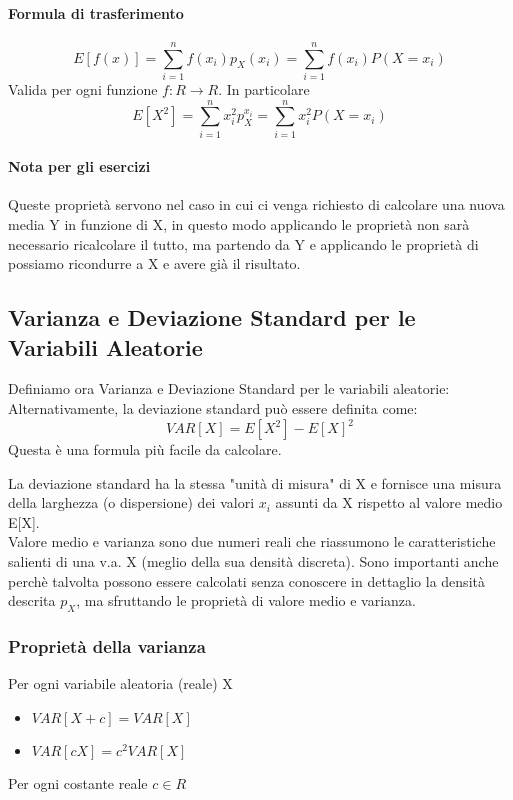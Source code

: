 \paragraph{Formula di trasferimento}
\begin{equation}
	E[f(x)] = \sum_{i = 1}^{n} f(x_i)p_X(x_i)
	= \sum_{i = 1}^{n}f(x_i)P(X = x_i)
\end{equation}
Valida per ogni funzione $f:R \to R$. In particolare
\begin{equation}
	E[X^2] = \sum_{i = 1}^{n} x_i^2 p_X^{x_i} = \sum_{i = 1}^{n} x_i^2P(X=x_i)
\end{equation}

\paragraph*{Nota per gli esercizi} Queste proprietà servono nel caso in cui ci venga
richiesto di calcolare una nuova media Y in funzione di X, in questo modo applicando
le proprietà non sarà necessario ricalcolare il tutto, ma partendo da Y e applicando
le proprietà di possiamo ricondurre a X e avere già il risultato.

\subsection[Varianza e Deviazione Standard]{Varianza e Deviazione Standard per le Variabili Aleatorie}
Definiamo ora Varianza e Deviazione Standard per le variabili aleatorie:
Alternativamente, la deviazione standard può essere definita come:
\[ VAR[X] = E[X^2] - E[X]^2 \]
Questa è una formula più facile da calcolare.

La deviazione standard ha la stessa "unità di misura" di X e fornisce
una misura della larghezza (o dispersione) dei valori $x_i$ assunti da X rispetto
al valore medio E[X].
\\Valore medio e varianza sono due numeri reali che riassumono
le caratteristiche salienti di una v.a. X (meglio della sua densità discreta).
Sono importanti anche perchè talvolta possono essere calcolati
senza conoscere in dettaglio la densità descrita $p_X$, ma sfruttando le
proprietà di valore medio e varianza.

\subsubsection{Proprietà della varianza}
Per ogni variabile aleatoria (reale) X
\begin{itemize}
	\item $VAR[X+c] = VAR[X]$
	\item $VAR[cX] = c^2 VAR[X]$
\end{itemize}
Per ogni costante reale $c \in R$
